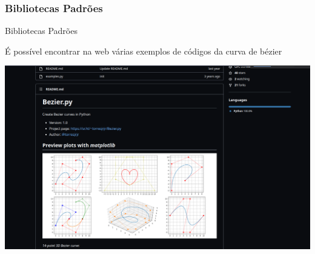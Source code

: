\documentclass[10pt]{beamer}
\theoremstyle{definition}
\begin{document}
\subsubsection{Bibliotecas Padrões}
\begin{frame}{Bibliotecas Padrões}
    
     {É possível encontrar na web várias exemplos de códigos da curva de bézier
    \begin{center}
        \includegraphics[width = 0.9 \linewidth]{bezier_code1.png}
    \end{center}}


\end{frame}
\end{document}
